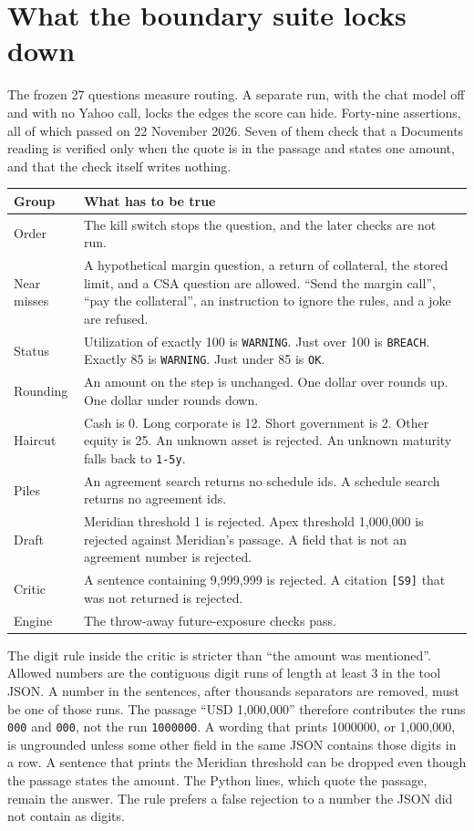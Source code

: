 \documentclass[11pt,a4paper]{article}
\begin{document}
\section{What the boundary suite locks down}

The frozen 27 questions measure routing. A separate run, with the chat model off and with no Yahoo call, locks the edges the score can hide. Forty-nine assertions, all of which passed on 22 November 2026. Seven of them check that a Documents reading is verified only when the quote is in the passage and states one amount, and that the check itself writes nothing.

\begin{center}
\small
\begin{tabular}{@{}p{3.3cm}p{11.2cm}@{}}
\toprule
Group & What has to be true \\
\midrule
Order &
The kill switch stops the question, and the later checks are not run. \\
Near misses &
A hypothetical margin question, a return of collateral, the stored limit, and a CSA question are allowed. ``Send the margin call'', ``pay the collateral'', an instruction to ignore the rules, and a joke are refused. \\
Status &
Utilization of exactly 100 is \texttt{WARNING}. Just over 100 is \texttt{BREACH}. Exactly 85 is \texttt{WARNING}. Just under 85 is \texttt{OK}. \\
Rounding &
An amount on the step is unchanged. One dollar over rounds up. One dollar under rounds down. \\
Haircut &
Cash is 0. Long corporate is 12. Short government is 2. Other equity is 25. An unknown asset is rejected. An unknown maturity falls back to \texttt{1-5y}. \\
Piles &
An agreement search returns no schedule ids. A schedule search returns no agreement ids. \\
Draft &
Meridian threshold 1 is rejected. Apex threshold 1{,}000{,}000 is rejected against Meridian's passage. A field that is not an agreement number is rejected. \\
Critic &
A sentence containing 9{,}999{,}999 is rejected. A citation \texttt{[S9]} that was not returned is rejected. \\
Engine &
The throw-away future-exposure checks pass. \\
\bottomrule
\end{tabular}
\end{center}

The digit rule inside the critic is stricter than ``the amount was mentioned''. Allowed numbers are the contiguous digit runs of length at least 3 in the tool JSON. A number in the sentences, after thousands separators are removed, must be one of those runs. The passage ``USD 1,000,000'' therefore contributes the runs \texttt{000} and \texttt{000}, not the run \texttt{1000000}. A wording that prints 1000000, or 1,000,000, is ungrounded unless some other field in the same JSON contains those digits in a row. A sentence that prints the Meridian threshold can be dropped even though the passage states the amount. The Python lines, which quote the passage, remain the answer. The rule prefers a false rejection to a number the JSON did not contain as digits.
\end{document}
